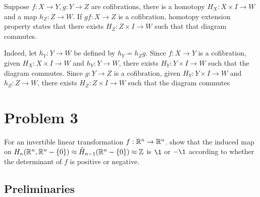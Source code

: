 \documentclass{article}
\begin{document}
\begin{center}
\end{center}

Suppose $f: X \to Y, g: Y \to Z$ are cofibrations, there is a homotopy $H_X: X \times I \to W$ and a map $h_Z: Z \to W$. If $gf: X \to Z$ is a cofibration, homotopy extension property states that there exists $H_Z: Z \times I \to W$ such that that diagram commutes.

Indeed, let $h_Y: Y \to W$ be defined by $h_Y = h_Z g$. Since $f: X \to Y$ is a cofibration, given $H_X: X \times I \to W$ and $h_Y: Y \to W$, there exists $H_Y: Y \times I \to W$ such that the diagram commutes. Since $g: Y \to Z$ is a cofibration, given $H_Y: Y \times I \to W$ and $h_Z: Z \to W$, there exists $H_Z: Z \times I \to W$ such that the diagram commutes

\section{Problem 3}
For an invertible linear transformation $f: \mathbb{R}^n \to \mathbb{R}^n$. show that the induced map on $H_n(\mathbb{R}^n, \mathbb{R}^n - \{0\}) \approx \Tilde{H}_{n-1}(\mathbb{R}^n - \{0\}) \approx \mathbb{Z}$ is $\1$ or $-\1$ according to whether the determinant of $f$ is positive or negative.

\subsection{Preliminaries}
\end{document}
